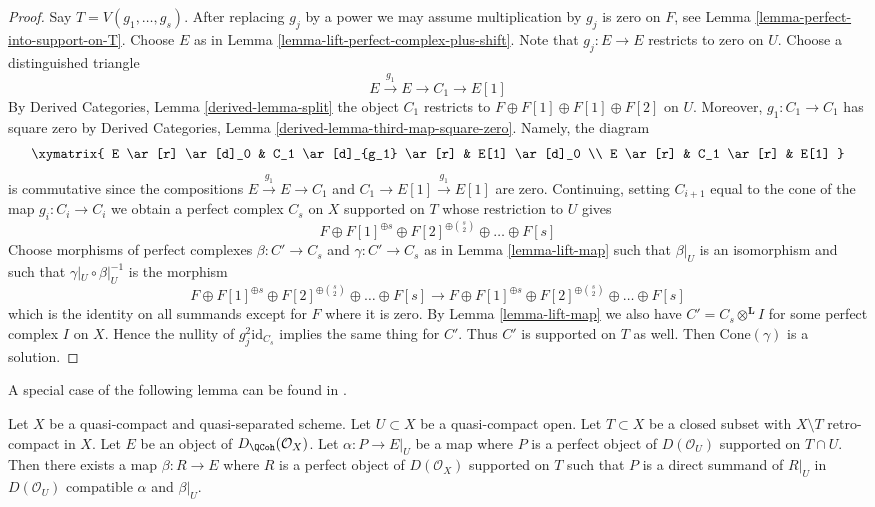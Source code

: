 \begin{proof}
Say $T = V(g_1, \ldots, g_s)$. After replacing $g_j$ by a power we
may assume multiplication by $g_j$ is zero on $F$, see
Lemma \ref{lemma-perfect-into-support-on-T}. Choose $E$ as in
Lemma \ref{lemma-lift-perfect-complex-plus-shift}.
Note that $g_j : E \to E$ restricts to zero on $U$.
Choose a distinguished triangle
$$
E \xrightarrow{g_1} E \to C_1 \to E[1]
$$
By Derived Categories, Lemma \ref{derived-lemma-split}
the object $C_1$ restricts to
$F \oplus F[1] \oplus F[1] \oplus F[2]$ on $U$.
Moreover, $g_1 : C_1 \to C_1$ has square zero by
Derived Categories, Lemma \ref{derived-lemma-third-map-square-zero}.
Namely, the diagram
$$
\xymatrix{
E \ar[r] \ar[d]_0 & C_1 \ar[d]_{g_1} \ar[r] & E[1] \ar[d]_0 \\
E \ar[r] & C_1 \ar[r] & E[1]
}
$$
is commutative since the compositions $E \xrightarrow{g_1} E \to C_1$ and
$C_1 \to E[1] \xrightarrow{g_1} E[1]$ are zero. Continuing, setting
$C_{i + 1}$ equal to the cone of the map $g_i : C_i \to C_i$ we obtain
a perfect complex $C_s$ on $X$ supported on $T$
whose restriction to $U$ gives
$$
F \oplus F[1]^{\oplus s} \oplus F[2]^{\oplus {s \choose 2}}
\oplus \ldots \oplus F[s]
$$
Choose morphisms of perfect complexes $\beta : C' \to C_s$
and $\gamma : C' \to C_s$ as in Lemma \ref{lemma-lift-map}
such that $\beta|_U$ is an isomorphism and such that
$\gamma|_U \circ \beta|_U^{-1}$ is the morphism
$$
F \oplus F[1]^{\oplus s} \oplus F[2]^{\oplus {s \choose 2}}
\oplus \ldots \oplus F[s]
\to
F \oplus F[1]^{\oplus s} \oplus F[2]^{\oplus {s \choose 2}}
\oplus \ldots \oplus F[s]
$$
which is the identity on all summands except for $F$ where it is zero.
By Lemma \ref{lemma-lift-map} we also have
$C' = C_s \otimes^\mathbf{L} I$ for some perfect complex
$I$ on $X$. Hence the nullity of $g_j^2\text{id}_{C_s}$ implies the
same thing for $C'$. Thus $C'$ is supported on $T$ as well.
Then $\text{Cone}(\gamma)$ is a solution.
\end{proof}

\noindent
A special case of the following lemma can be found in
\cite{Neeman-Grothendieck}.

\begin{lemma}
\label{lemma-lift-map-from-perfect-complex-with-support}
Let $X$ be a quasi-compact and quasi-separated scheme.
Let $U \subset X$ be a quasi-compact open. Let $T \subset X$
be a closed subset with $X \setminus T$ retro-compact in $X$.
Let $E$ be an object of $D_\QCoh(\mathcal{O}_X)$.
Let $\alpha : P \to E|_U$ be a map where $P$ is a perfect object of
$D(\mathcal{O}_U)$ supported on $T \cap U$. Then there exists a map
$\beta : R \to E$ where $R$ is a perfect object of $D(\mathcal{O}_X)$
supported on $T$ such that $P$ is a direct summand of $R|_U$ in
$D(\mathcal{O}_U)$ compatible $\alpha$ and $\beta|_U$.
\end{lemma}

